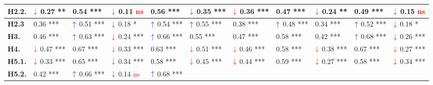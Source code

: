 \begin{table}[htpb]
{\begin{tabular}{|l|ll|ll|ll|ll|ll|}
\textbf{H2.2.} &
  \multicolumn{1}{l|}{$\textcolor{red}{\downarrow}$ 0.27 **} &
  0.54 *** &
  \multicolumn{1}{l|}{$\textcolor{red}{\downarrow}$ 0.11 \textcolor{red}{ns}} &
  0.56 *** &
  \multicolumn{1}{l|}{$\textcolor{red}{\downarrow}$ 0.35 ***} &
  $\textcolor{red}{\downarrow}$ 0.36 *** &
  \multicolumn{1}{l|}{0.47 ***} &
  $\textcolor{red}{\downarrow}$ 0.24 ** &
  \multicolumn{1}{l|}{0.49 ***} &
  $\textcolor{red}{\downarrow}$ 0.15 \textcolor{red}{ns} \\ \hline
\textbf{H2.3} &
  \multicolumn{1}{l|}{0.36 ***} &
  $\textcolor{blue}{\uparrow}$ 0.51 *** &
  \multicolumn{1}{l|}{$\textcolor{red}{\downarrow}$ 0.18 *} &
  $\textcolor{blue}{\uparrow}$ 0.54 *** &
  \multicolumn{1}{l|}{$\textcolor{blue}{\uparrow}$ 0.55 ***} &
  0.38 *** &
  \multicolumn{1}{l|}{$\textcolor{blue}{\uparrow}$ 0.48 ***} &
  0.34 *** &
  \multicolumn{1}{l|}{$\textcolor{blue}{\uparrow}$ 0.52 ***} &
  $\textcolor{red}{\downarrow}$ 0.18 * \\ \hline
\textbf{H3.} &
  \multicolumn{1}{l|}{0.46 ***} &
  $\textcolor{blue}{\uparrow}$ 0.63 *** &
  \multicolumn{1}{l|}{$\textcolor{red}{\downarrow}$ 0.24 ***} &
  $\textcolor{blue}{\uparrow}$ 0.66 *** &
  \multicolumn{1}{l|}{0.55 ***} &
  0.47 *** &
  \multicolumn{1}{l|}{0.58 ***} &
  0.42 *** &
  \multicolumn{1}{l|}{$\textcolor{blue}{\uparrow}$ 0.68 ***} &
  $\textcolor{red}{\downarrow}$ 0.26 *** \\ \hline
\textbf{H4.} &
  \multicolumn{1}{l|}{$\textcolor{red}{\downarrow}$ 0.47 ***} &
  0.67 *** &
  \multicolumn{1}{l|}{$\textcolor{red}{\downarrow}$ 0.33 ***} &
  0.63 *** &
  \multicolumn{1}{l|}{$\textcolor{red}{\downarrow}$ 0.51 ***} &
  $\textcolor{red}{\downarrow}$ 0.46 *** &
  \multicolumn{1}{l|}{0.58 ***} &
  $\textcolor{red}{\downarrow}$ 0.38 *** &
  \multicolumn{1}{l|}{0.67 ***} &
  $\textcolor{red}{\downarrow}$ 0.27 *** \\ \hline
\textbf{H5.1.} &
  \multicolumn{1}{l|}{$\textcolor{red}{\downarrow}$ 0.33 ***} &
  0.65 *** &
  \multicolumn{1}{l|}{$\textcolor{red}{\downarrow}$ 0.34 ***} &
  0.58 *** &
  \multicolumn{1}{l|}{$\textcolor{red}{\downarrow}$ 0.45 ***} &
  $\textcolor{red}{\downarrow}$ 0.44 *** &
  \multicolumn{1}{l|}{0.59 ***} &
  $\textcolor{red}{\downarrow}$ 0.27 *** &
  \multicolumn{1}{l|}{0.58 ***} &
  $\textcolor{red}{\downarrow}$ 0.34 *** \\ \hline
\textbf{H5.2.} &
  \multicolumn{1}{l|}{0.42 ***} &
  $\textcolor{blue}{\uparrow}$ 0.66 *** &
  \multicolumn{1}{l|}{$\textcolor{red}{\downarrow}$ 0.14 \textcolor{red}{ns}} &
  $\textcolor{blue}{\uparrow}$ 0.68 *** &

\end{tabular}}
\end{table}
